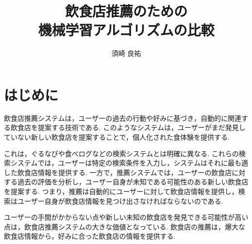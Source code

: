 \documentclass[12pt,a4j]{jreport}
\begin{document}
\author{須崎 良祐}
\title{飲食店推薦のための\\機械学習アルゴリズムの比較}

\maketitle


\chapter{はじめに}

飲食店推薦システムは，ユーザーの過去の行動や好みに基づき，自動的に関連する飲食店を提案する技術である.
このようなシステムは，ユーザーがまだ発見していない新しい飲食店を提案することで，個人化された食体験を提供する.

これは，ぐるなびや食べログなどの検索システムとは明確に異なる.
これらの検索システムでは，ユーザーは特定の検索条件を入力し，システムはそれに最も適した飲食店情報を提供する.
一方で，推薦システムでは，ユーザーの飲食店に対する過去の評価を分析し，ユーザー自身が未知である可能性のある新しい飲食店を提案する.
つまり，推薦は自動的にユーザーに対して飲食店情報を提供し，検索はユーザー自身が飲食店情報を見つけ出さなければならないのである.

ユーザーの手間がかからない点や新しい未知の飲食店を発見できる可能性が高い点は，飲食店推薦システムの大きな価値となっている.
飲食店の推薦は，爆大な飲食店情報から，好みに合った飲食店の情報を提供する.
\end{document}
